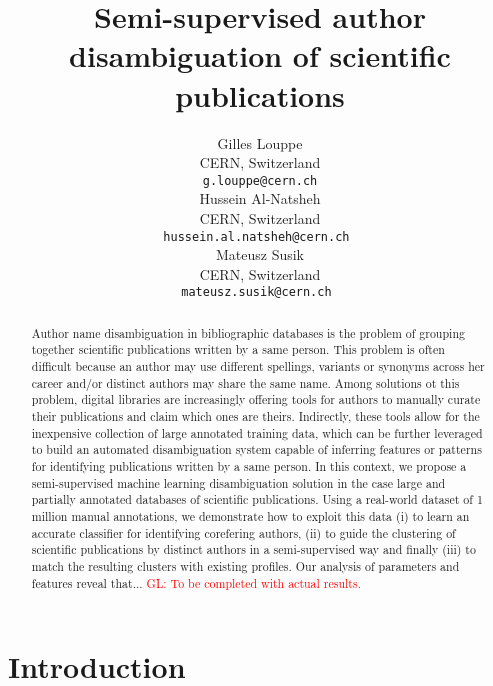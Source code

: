 \documentclass{article}
\title{Semi-supervised author disambiguation of scientific publications}
\author{Gilles Louppe\\
        CERN, Switzerland\\
        \texttt{g.louppe@cern.ch}\\
\And Hussein Al-Natsheh\\
        CERN, Switzerland\\
        \texttt{hussein.al.natsheh@cern.ch }\\
\And Mateusz Susik\\
        CERN, Switzerland\\
        \texttt{mateusz.susik@cern.ch }\\ }
\date{}
\newcommand{\glnote}[1]{\textcolor{red}{GL: #1}}
\begin{document}
\maketitle

\begin{abstract}

Author name disambiguation in bibliographic databases is the problem of
grouping together scientific publications written by a same person. This
problem is often difficult because an author may use different spellings,
variants or synonyms across her career and/or distinct authors may share the
same name. Among solutions ot this problem, digital libraries are increasingly
offering tools for authors to manually curate their publications and claim
which ones are theirs. Indirectly, these tools allow for the inexpensive
collection of large annotated training data, which can be further leveraged to
build an automated disambiguation system capable of inferring features or
patterns for identifying publications written by a same person.  In this
context, we propose a semi-supervised machine learning disambiguation solution
in the case large and partially annotated databases of scientific publications.
Using a real-world dataset of 1 million manual annotations, we demonstrate how
to exploit this data (i) to learn an accurate classifier for identifying
corefering authors, (ii) to guide the clustering of scientific publications by
distinct authors in a semi-supervised way and finally (iii) to match the
resulting clusters with existing profiles.  Our analysis of parameters and
features reveal that... \glnote{To be completed with actual results.}

\end{abstract}



\section{Introduction}
\label{introduction}

\end{document}
